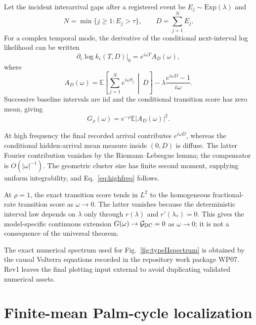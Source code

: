 \documentclass[aps,prapplied,preprint,nofootinbib]{revtex4-2}
\newcommand{\GDC}{\mathcal G_{\rm DC}}
\newcommand{\E}{\mathbb E}
\begin{document}
Let the incident interarrival gaps after a registered event be $E_j\sim\mathrm{Exp}(\lambda)$ and
\begin{equation}
N=\min\{j\ge1:E_j>\tau\},
\qquad
D=\sum_{j=1}^{N}E_j.
\end{equation}
For a complex temporal mode, the derivative of the conditional next-interval log likelihood can be written
\begin{equation}
\partial_\epsilon\log k_\epsilon(T,D)\big|_0
=e^{i\omega T}A_D(\omega),
\end{equation}
where
\begin{equation}
A_D(\omega)
=
\E\left[
\sum_{j=1}^{N}e^{i\omega S_j}
\,\middle|\,D
\right]
-\lambda\frac{e^{i\omega D}-1}{i\omega}.
\label{eq:AD}
\end{equation}
Successive baseline intervals are iid and the conditional transition score has zero mean, giving
\begin{equation}
G_\rho(\omega)=e^{-\rho}\E|A_D(\omega)|^2.
\end{equation}

At high frequency the final recorded arrival contributes $e^{i\omega D}$, whereas the conditional hidden-arrival mean measure inside $(0,D)$ is diffuse. The latter Fourier contribution vanishes by the Riemann--Lebesgue lemma; the compensator is $O(|\omega|^{-1})$. The geometric cluster size has finite second moment, supplying uniform integrability, and Eq.~\eqref{eq:highfreq} follows.

At $\rho=1$, the exact transition score tends in $L^2$ to the homogeneous fractional-rate transition score as $\omega\to0$. The latter vanishes because the deterministic interval law depends on $\lambda$ only through $r(\lambda)$ and $r'(\lambda_*)=0$. This gives the model-specific continuous extension $G(\omega)\to\GDC=0$ as $\omega\to0$; it is not a consequence of the universal theorem.

The exact numerical spectrum used for Fig.~\ref{fig:typeIIspectrum} is obtained by the causal Volterra equations recorded in the repository work package WP07. Rev1 leaves the final plotting input external to avoid duplicating validated numerical assets.

\section{Finite-mean Palm-cycle localization}
\label{app:cycle}
\end{document}
